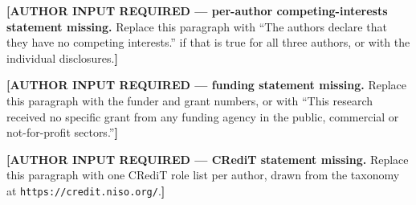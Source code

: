 \documentclass[referee,lineno,pdflatex,sn-vancouver-num]{sn-jnl}
\theoremstyle{thmstyleone}%
\theoremstyle{thmstyletwo}%
\theoremstyle{thmstylethree}%
\begin{document}
\textbf{[AUTHOR INPUT REQUIRED --- per-author competing-interests statement
missing.} Replace this paragraph with ``The authors declare that they have
no competing interests.'' if that is true for all three authors, or with the
individual disclosures.\textbf{]}


\textbf{[AUTHOR INPUT REQUIRED --- funding statement missing.} Replace this
paragraph with the funder and grant numbers, or with ``This research received
no specific grant from any funding agency in the public, commercial or
not-for-profit sectors.''\textbf{]}

\textbf{[AUTHOR INPUT REQUIRED --- CRediT statement missing.} Replace this
paragraph with one CRediT role list per author, drawn from the taxonomy at
\nolinkurl{https://credit.niso.org/}.\textbf{]}
\end{document}
